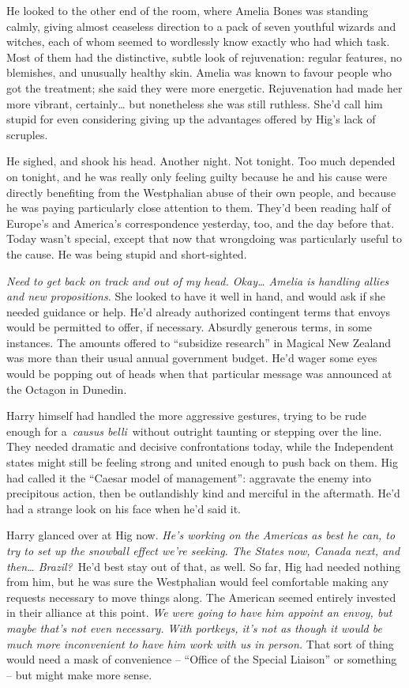 He looked to the other end of the room, where Amelia Bones was standing
calmly, giving almost ceaseless direction to a pack of seven youthful
wizards and witches, each of whom seemed to wordlessly know exactly who
had which task. Most of them had the distinctive, subtle look of
rejuvenation: regular features, no blemishes, and unusually healthy
skin. Amelia was known to favour people who got the treatment; she said
they were more energetic. Rejuvenation had made her more vibrant,
certainly\ldots{} but nonetheless she was still ruthless. She'd call him
stupid for even considering giving up the advantages offered by Hig's
lack of scruples.

He sighed, and shook his head. Another night. Not tonight. Too much
depended on tonight, and he was really only feeling guilty because he
and his cause were directly benefiting from the Westphalian abuse of
their own people, and because he was paying particularly close attention
to them. They'd been reading half of Europe's and America's
correspondence yesterday, too, and the day before that. Today wasn't
special, except that now that wrongdoing was particularly useful to the
cause. He was being stupid and short-sighted.

\emph{Need to get back on track and out of my head. Okay\ldots{} Amelia
is handling allies and new propositions.} She looked to have it well in
hand, and would ask if she needed guidance or help. He'd already
authorized contingent terms that envoys would be permitted to offer, if
necessary. Absurdly generous terms, in some instances. The amounts
offered to ``subsidize research'' in Magical New Zealand was more than
their usual annual government budget. He'd wager some eyes would be
popping out of heads when that particular message was announced at the
Octagon in Dunedin.

Harry himself had handled the more aggressive gestures, trying to be
rude enough for a~\emph{causus belli}~without outright taunting or
stepping over the line. They needed dramatic and decisive confrontations
today, while the Independent states might still be feeling strong and
united enough to push back on them. Hig had called it the ``Caesar model
of management'': aggravate the enemy into precipitous action, then be
outlandishly kind and merciful in the aftermath. He'd had a strange look
on his face when he'd said it.

Harry glanced over at Hig now. \emph{He's working on the Americas as
best he can, to try to set up the snowball effect we're seeking. The
States now, Canada next, and then\ldots{} Brazil?}~He'd best stay out of
that, as well. So far, Hig had needed nothing from him, but he was sure
the Westphalian would feel comfortable making any requests necessary to
move things along. The American seemed entirely invested in their
alliance at this point. \emph{We were going to have him appoint an
envoy, but maybe that's not even necessary. With portkeys, it's not as
though it would be much more inconvenient to have him work with us in
person.} That sort of thing would need a mask of convenience -- ``Office
of the Special Liaison'' or something -- but might make more sense.

